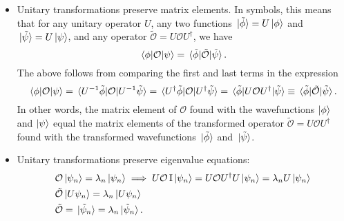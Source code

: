 \documentclass[11pt, a4paper]{article}
\renewcommand{\t}[1]{\tilde{#1}}
\renewcommand{\O}{\mathcal{O}}  %
\newcommand{\II}{\operatorname{I}}  %
\newcommand{\p}{\psi}  %
\begin{document}
\begin{itemize}
	
    \item Unitary transformations preserve matrix elements. In symbols, this means that for any unitary operator $ U $, any two functions $ \ket*{\t{\phi}} = U\ket{\phi} $ and $ \ket*{\t{\p}} = U \ket{\p} $, and any operator $ \tilde{\O} = U \O U^{\dagger} $, we have
    \begin{equation*}
        \mel{\phi}{\O}{\psi} = \mel*{\tilde{\phi}}{\tilde{\O}}{\tilde{\psi}}.
    \end{equation*}
	The above follows from comparing the first and last terms in the expression
	\begin{equation*}
        \mel{\phi}{\O}{\p} = \mel*{U^{-1}\t{\phi}}{\O}{U^{-1}\t{\p}} = \mel*{U^{\dagger}\t{\phi}}{\O}{U^{\dagger}\t{\p}} =  \mel*{\t{\phi}}{U\O U^{\dagger}}{\t{\p}} \equiv  \mel*{\t{\phi}}{\t{\O}}{\t{\p}}.
	\end{equation*}
    In other words, the matrix element of $ \O $ found with the wavefunctions $ \ket{\phi} $ and $ \ket{\p} $ equal the matrix elements of the transformed operator $ \t{\O} = U \O U^{\dagger}  $ found with the transformed wavefunctions $  \ket*{\t{\phi}} $ and $ \ket*{\t{\p}} $.
	
	\item Unitary transformations preserve eigenvalue equations:
	\begin{align*}
		&\O\ket{\psi_{n}} = \lambda_{n} \ket{\p_{n}} \implies U \O \II \ket{\p_{n}} = U \O U^{\dagger}U \ket{\p_{n}} = \lambda_{n} U\ket{\p_{n}}\\
		&\t{\O} \ket{U\p_{n}} = \lambda_{n}\ket{U\p_{n}}\\
		&\t{\O} = \ket*{\t{\p}_{n}} = \lambda_{n} \ket*{\t{\p}_{n}}.
	\end{align*}
	
\end{itemize}
\end{document}
